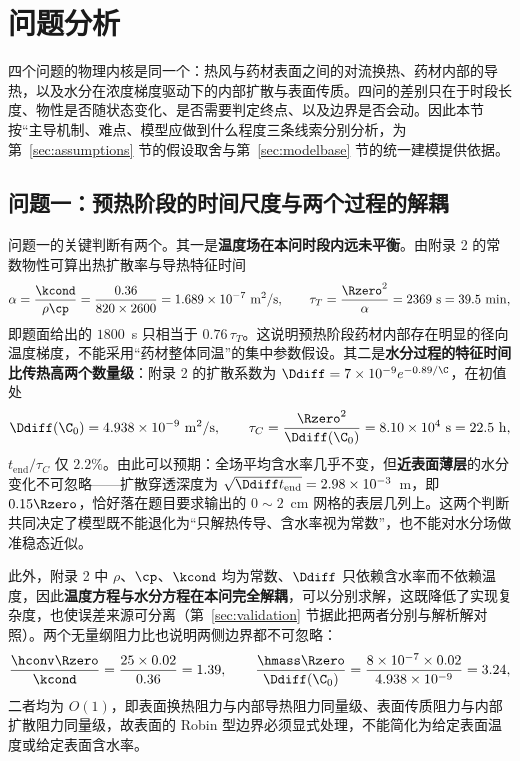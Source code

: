 \section{问题分析}

四个问题的物理内核是同一个：热风与药材表面之间的对流换热、药材内部的导热，以及水分在浓度梯度驱动下的内部扩散与表面传质。四问的差别只在于时段长度、物性是否随状态变化、是否需要判定终点、以及边界是否会动。因此本节按``主导机制、难点、模型应做到什么程度三条线索分别分析，为第~\ref{sec:assumptions} 节的假设取舍与第~\ref{sec:modelbase} 节的统一建模提供依据。

\subsection{问题一：预热阶段的时间尺度与两个过程的解耦}

问题一的关键判断有两个。其一是\textbf{温度场在本问时段内远未平衡}。由附录 2 的常数物性可算出热扩散率与导热特征时间
\begin{equation}
\alpha=\frac{\kcond}{\rho\cp}=\frac{0.36}{820\times2600}=1.689\times10^{-7}~\mathrm{m^2/s},
\qquad
\tau_T=\frac{{\Rzero}^2}{\alpha}=2369~\mathrm{s}=39.5~\mathrm{min},
\label{eq:tauT}
\end{equation}
即题面给出的 $1800$~s 只相当于 $0.76\,\tau_T$。这说明预热阶段药材内部存在明显的径向温度梯度，不能采用``药材整体同温''的集中参数假设。其二是\textbf{水分过程的特征时间比传热高两个数量级}：附录 2 的扩散系数为 $\Ddiff=7\times10^{-9}e^{-0.89/\C}$，在初值处
\begin{equation}
\Ddiff({\C}_0)=4.938\times10^{-9}~\mathrm{m^2/s},
\qquad
\tau_C=\frac{{\Rzero}^2}{\Ddiff({\C}_0)}=8.10\times10^{4}~\mathrm{s}=22.5~\mathrm{h},
\label{eq:tauC}
\end{equation}
$t_{\mathrm{end}}/\tau_C$ 仅 $2.2\%$。由此可以预期：全场平均含水率几乎不变，但\textbf{近表面薄层}的水分变化不可忽略——扩散穿透深度为 $\sqrt{\Ddiff t_{\mathrm{end}}}=2.98\times10^{-3}$~m，即 $0.15\Rzero$，恰好落在题目要求输出的 $0\sim2$~cm 网格的表层几列上。这两个判断共同决定了模型既不能退化为``只解热传导、含水率视为常数''，也不能对水分场做准稳态近似。

此外，附录 2 中 $\rho$、$\cp$、$\kcond$ 均为常数、$\Ddiff$ 只依赖含水率而不依赖温度，因此\textbf{温度方程与水分方程在本问完全解耦}，可以分别求解，这既降低了实现复杂度，也使误差来源可分离（第~\ref{sec:validation} 节据此把两者分别与解析解对照）。两个无量纲阻力比也说明两侧边界都不可忽略：
\begin{equation}
\frac{\hconv\Rzero}{\kcond}=\frac{25\times0.02}{0.36}=1.39,
\qquad
\frac{\hmass\Rzero}{\Ddiff({\C}_0)}=\frac{8\times10^{-7}\times0.02}{4.938\times10^{-9}}=3.24,
\end{equation}
二者均为 $O(1)$，即表面换热阻力与内部导热阻力同量级、表面传质阻力与内部扩散阻力同量级，故表面的 Robin 型边界必须显式处理，不能简化为给定表面温度或给定表面含水率。

